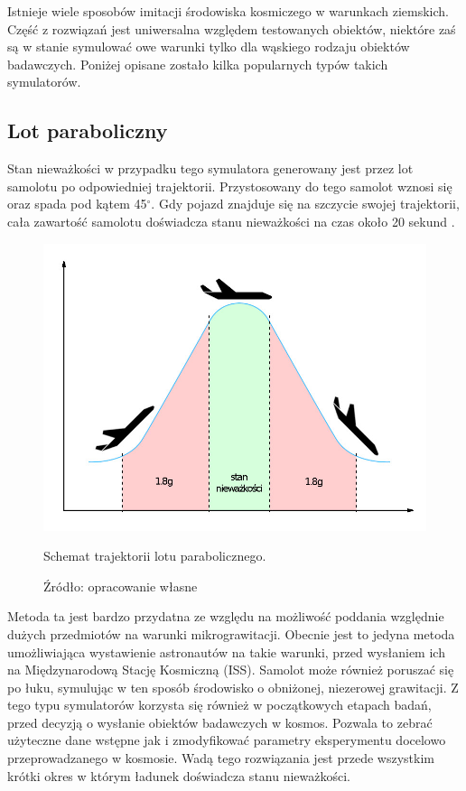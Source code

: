Istnieje wiele sposobów imitacji środowiska kosmiczego w warunkach ziemskich. Część z
 rozwiązań jest uniwersalna względem testowanych obiektów, niektóre zaś są w stanie
  symulować owe warunki tylko dla wąskiego rodzaju obiektów badawczych. Poniżej opisane
   zostało kilka popularnych typów takich symulatorów.

\subsection{Lot paraboliczny}

Stan nieważkości w przypadku tego symulatora generowany jest przez lot samolotu po
 odpowiedniej trajektorii. Przystosowany do tego samolot wznosi się oraz spada pod kątem
  45$^\circ$. Gdy pojazd znajduje się na szczycie swojej trajektorii, cała zawartość
   samolotu doświadcza stanu nieważkości na czas około 20 sekund
    \cite{bib:lot_paraboliczny}. 

\begin{figure}[h]
	
	\centering
	\includegraphics[scale=1.3]{lot_para_sch.jpg}
	\caption{Schemat trajektorii lotu parabolicznego.}
	\caption*{Źródło: opracowanie własne}
	\label{fig:paraboliczny}
	
\end{figure}

Metoda ta jest bardzo przydatna ze względu na możliwość poddania względnie dużych
 przedmiotów na warunki mikrograwitacji. Obecnie jest to jedyna metoda umożliwiająca
  wystawienie astronautów na takie warunki, przed wysłaniem ich na Międzynarodową Stację
   Kosmiczną (ISS)\cite{bib:lot_paraboliczny}. Samolot może również poruszać się po
    łuku, symulując w ten sposób środowisko o obniżonej, niezerowej grawitacji. Z tego
     typu symulatorów korzysta się również w początkowych etapach badań, przed decyzją o
      wysłanie obiektów badawczych w kosmos. Pozwala to zebrać użyteczne dane wstępne
       jak i zmodyfikować parametry eksperymentu docelowo przeprowadzanego w kosmosie.
        Wadą tego rozwiązania jest przede wszystkim krótki okres w którym ładunek
         doświadcza stanu nieważkości.

